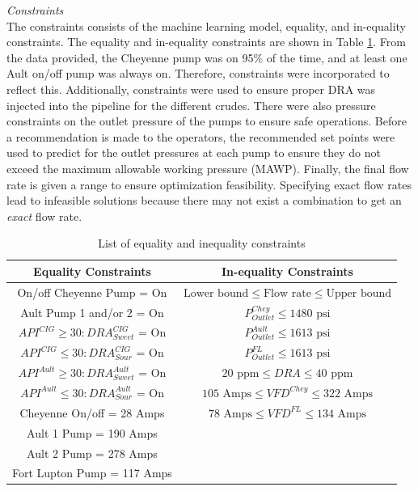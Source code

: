 \noindent
\textit{Constraints} \\
The constraints consists of the machine learning model, equality, and in-equality constraints.  The equality and in-equality constraints are shown in Table \ref{tab:08eq_neq_constraints}. From the data provided, the Cheyenne pump was on 95\% of the time, and at least one Ault on/off pump was always on. Therefore, constraints were incorporated to reflect this.  Additionally, constraints were used to ensure proper DRA was injected into the pipeline for the different crudes.  There were also pressure constraints on the outlet pressure of the pumps to ensure safe operations.  Before a recommendation is made to the operators, the recommended set points were used to predict for the outlet pressures at each pump to ensure they do not exceed the maximum allowable working pressure (MAWP). Finally, the final flow rate is given a range to ensure optimization feasibility. Specifying exact flow rates lead to infeasible solutions because there may not exist a combination to get an \textit{exact} flow rate.

\begin{table}[h]
    \centering
    {
    \begin{tabular}{c|c}
         Equality Constraints              & In-equality Constraints \\
         \hline
         On/off Cheyenne Pump = On         & $\text{Lower bound} \leq \text{Flow rate} \leq \text{Upper bound}$ \\
         
         Ault Pump 1 and/or 2 = On          & $P_{Outlet}^{Chey} \leq 1480 \text{ psi}$       \\
         
         $API^{CIG} \geq 30: DRA_{Sweet}^{CIG}$ = On & $P_{Outlet}^{Ault} \leq 1613 \text{ psi}$ \\
         
         $API^{CIG} \leq 30: DRA_{Sour}^{CIG}$ = On  & $P_{Outlet}^{FL} \leq 1613 \text{ psi}$  \\
         
         $API^{Ault} \geq 30: DRA_{Sweet}^{Ault}$ = On & $20 \text{ ppm} \leq DRA \leq 40 \text{ ppm}$                 \\
         
         $API^{Ault} \leq 30: DRA_{Sour}^{Ault}$  = On  & $105 \text{ Amps} \leq VFD^{Chey} \leq 322 \text{ Amps}$   \\
         
         Cheyenne On/off = 28 Amps  & $78 \text{ Amps} \leq VFD^{FL} \leq 134 \text{ Amps}$  \\
         Ault 1 Pump = 190 Amps & \\
         Ault 2 Pump = 278 Amps & \\
         Fort Lupton Pump = 117 Amps & \\
    \end{tabular}}   
    \caption{List of equality and inequality constraints}
    \label{tab:08eq_neq_constraints}
\end{table}

